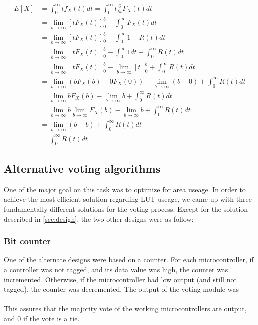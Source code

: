 \begin{align*}
  E[X] &= \int_0^{\infty}tf_X(t)dt = \int_0^{\infty}t\frac{\partial}{\partial t} F_X(t)dt \\
       &= \lim_{b \to \infty}[tF_X(t)]_{0}^b - \int_0^{\infty}F_X(t)dt \\
       &= \lim_{b \to \infty}[tF_X(t)]_0^b - \int_0^{\infty}1 - R(t)dt \\
       &= \lim_{b \to \infty}[tF_X(t)]_0^b - \int_0^\infty1dt + \int_0^{\infty}R(t)dt \\
       &= \lim_{b \to \infty}[tF_X(t)]_0^b - \lim_{b \to \infty}[t]_0^b + \int_0^{\infty}R(t)dt \\
       &= \lim_{b \to \infty}(bF_X(b) - 0F_X(0)) - \lim_{b \to \infty}(b - 0) + \int_0^{\infty}R(t)dt \\
       &= \lim_{b \to \infty}bF_X(b) - \lim_{b \to \infty}b + \int_0^{\infty}R(t)dt \\
       &= \lim_{b \to \infty}b\lim_{b \to \infty}F_X(b) - \lim_{b \to \infty}b + \int_0^{\infty}R(t)dt \\
       &= \lim_{b \to \infty}(b - b) + \int_0^{\infty}R(t)dt \\
       &= \int_0^{\infty}R(t)dt
\end{align*}





\subsection{Alternative voting algorithms}
One of the major goal on this task was to optimize for area useage. In order to achieve the most
efficient solution regarding LUT useage, we came up with three fundamentally different solutions
for the voting process. Except for the solution described in \autoref{sec:design}, the two other
designs were as follow:

\subsubsection{Bit counter}
One of the alternate designs were based on a counter. For each microcontroller, if a controller
was not tagged, and its data value was high, the counter was incremented. Otherwise, if the
microcontroller had low output (and still not tagged), the counter was decremented. The output of
the voting module was\\\hspace*{.3in}{\ttfamily if cnt > 0 then 1 else 0}\\
This assures that the majority vote of the working microcontrollers are output, and 0 if the vote is a tie.

